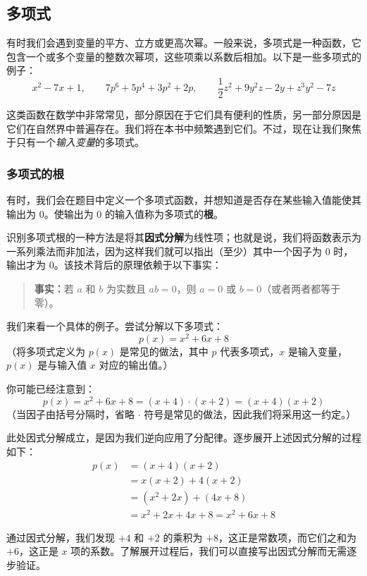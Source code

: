\subsection{多项式}

有时我们会遇到变量的平方、立方或更高次幂。一般来说，多项式是一种函数，它包含一个或多个变量的整数次幂项，这些项乘以系数后相加。以下是一些多项式的例子：
\[x^2 - 7x + 1,\qquad 7p^6 + 5p^4 + 3p^2 + 2p,\qquad \frac{1}{2}z^2 + 9y^2z - 2y + z^3y^2 - 7z\]

这类函数在数学中非常常见，部分原因在于它们具有便利的性质，另一部分原因是它们在自然界中普遍存在。我们将在本书中频繁遇到它们。不过，现在让我们聚焦于只有一个\emph{输入变量}的多项式。

\subsubsection*{多项式的根}

有时，我们会在题目中定义一个多项式函数，并想知道是否存在某些输入值能使其输出为 $0$。使输出为 $0$ 的输入值称为多项式的\textbf{根}。

识别多项式根的一种方法是将其\textbf{因式分解}为线性项；也就是说，我们将函数表示为一系列乘法而非加法，因为这样我们就可以指出（至少）其中一个因子为 $0$ 时，输出才为 $0$。该技术背后的原理依赖于以下事实：

\begin{quote}
    \textbf{事实：}若 $a$ 和 $b$ 为实数且 $ab=0$，则 $a=0$ 或 $b=0$（或者两者都等于零）。
\end{quote}

\begin{example}
    我们来看一个具体的例子。尝试分解以下多项式：
    \[p(x) = x^2 + 6x + 8\]
    （将多项式定义为 $p(x)$ 是常见的做法，其中 $p$ 代表多项式，$x$ 是输入变量，$p(x)$ 是与输入值 $x$ 对应的输出值。）

    你可能已经注意到：
    \[p(x) = x^2 + 6x + 8 = (x + 4) \cdot (x + 2) = (x + 4)(x + 2)\]
    （当因子由括号分隔时，省略 $\cdot$ 符号是常见的做法，因此我们将采用这一约定。）

    此处因式分解成立，是因为我们逆向应用了分配律。逐步展开上述因式分解的过程如下：
    \begin{align*}
        p(x) &= (x + 4)(x + 2) \\
        &= x(x + 2) + 4(x + 2) \\
        &= (x^2 + 2x) + (4x + 8) \\
        &= x^2 + 2x + 4x + 8 = x^2 + 6x + 8
    \end{align*}

    通过因式分解，我们发现 $+4$ 和 $+2$ 的乘积为 $+8$，这正是常数项，而它们之和为 $+6$，这正是 $x$ 项的系数。了解展开过程后，我们可以直接写出因式分解而无需逐步验证。
\end{example}

